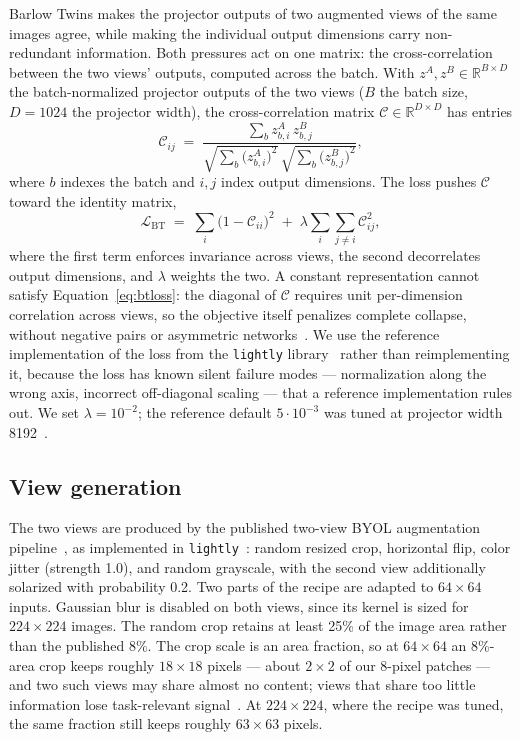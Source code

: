 Barlow Twins makes the projector outputs of two augmented views of the same
images agree, while making the individual output dimensions carry
non-redundant information. Both pressures act on one matrix: the
cross-correlation between the two views' outputs, computed across the batch.
With $z^A, z^B \in \mathbb{R}^{B \times D}$ the batch-normalized projector
outputs of the two views ($B$ the batch size, $D=1024$ the projector width),
the cross-correlation matrix $\mathcal{C} \in \mathbb{R}^{D \times D}$ has
entries
\begin{equation}
  \mathcal{C}_{ij} \;=\;
  \frac{\sum_{b} z^{A}_{b,i}\, z^{B}_{b,j}}
       {\sqrt{\sum_{b} \bigl(z^{A}_{b,i}\bigr)^{2}}\,
        \sqrt{\sum_{b} \bigl(z^{B}_{b,j}\bigr)^{2}}},
  \label{eq:crosscorr}
\end{equation}
where $b$ indexes the batch and $i,j$ index output dimensions. The loss
pushes $\mathcal{C}$ toward the identity matrix,
\begin{equation}
  \mathcal{L}_{\mathrm{BT}} \;=\;
  \sum_{i} \bigl(1 - \mathcal{C}_{ii}\bigr)^{2}
  \;+\; \lambda \sum_{i} \sum_{j \neq i} \mathcal{C}_{ij}^{2},
  \label{eq:btloss}
\end{equation}
where the first term enforces invariance across views, the second
decorrelates output dimensions, and $\lambda$ weights the two. A constant
representation cannot satisfy Equation~\ref{eq:btloss}: the diagonal of
$\mathcal{C}$ requires unit per-dimension correlation across views, so the
objective itself penalizes complete collapse, without negative pairs or
asymmetric networks~\cite{zbontar2021barlow}. We use the reference
implementation of the loss from the \texttt{lightly}
library~\cite{susmelj2020lightly} rather than reimplementing it, because the
loss has known silent failure modes --- normalization along the wrong axis,
incorrect off-diagonal scaling --- that a reference implementation rules
out. We set $\lambda = 10^{-2}$; the reference default $5 \cdot 10^{-3}$ was
tuned at projector width 8192~\cite{zbontar2021barlow}.

\subsection{View generation}
\label{sec:method_views}

The two views are produced by the published two-view BYOL augmentation
pipeline~\cite{grill2020byol}, as implemented in
\texttt{lightly}~\cite{susmelj2020lightly}: random resized crop, horizontal
flip, color jitter (strength 1.0), and random grayscale, with the second view
additionally solarized with probability 0.2. Two parts of the recipe are
adapted to $64\times64$ inputs. Gaussian blur is disabled on both views,
since its kernel is sized for $224\times224$ images. The random crop retains
at least 25\% of the image area rather than the published 8\%. The crop
scale is an area fraction, so at $64\times64$ an 8\%-area crop keeps roughly
$18\times18$ pixels --- about $2\times2$ of our 8-pixel patches --- and two
such views may share almost no content; views that share too little
information lose task-relevant signal~\cite{tian2020infomin}. At
$224\times224$, where the recipe was tuned, the same fraction still keeps
roughly $63\times63$ pixels.

